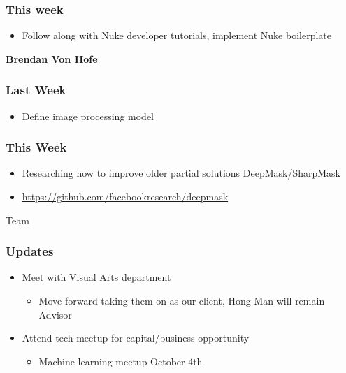 \documentclass[11pt]{article}
\begin{document}
\subsubsection{This week}
\label{sec:org4a4f2e7}
\begin{itemize}
\item Follow along with Nuke developer tutorials, implement Nuke boilerplate
\end{itemize}
\textbf{Brendan Von Hofe}
\subsubsection{Last Week}
\label{sec:org4971971}
\begin{itemize}
\item Define image processing model
\end{itemize}
\subsubsection{This Week}
\label{sec:orga3b66d3}
\begin{itemize}
\item Researching how to improve older partial solutions DeepMask/SharpMask
\item \url{https://github.com/facebookresearch/deepmask}
\end{itemize}

Team  
\subsubsection{Updates}
\label{sec:org9bb0323}
\begin{itemize}
\item Meet with Visual Arts department
\begin{itemize}
\item Move forward taking them on as our client, Hong Man will remain Advisor
\end{itemize}
\item Attend tech meetup for capital/business opportunity
\begin{itemize}
\item Machine learning meetup October 4th
\end{itemize}
\end{itemize}
\end{document}
